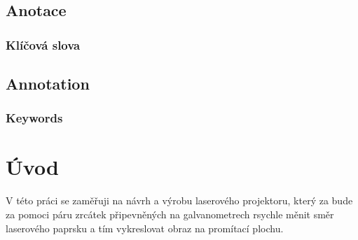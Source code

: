 \documentclass{template/socthesis}
\author{Šimon Hrouda}
\begin{document}
\newcommand{\bardgen}[3]{following text generated by ai (google bard) on #1\\%
  \begin{tcolorbox}[breakable, colback=blue!20]
      #2
  \end{tcolorbox}
  \begin{tcolorbox}[breakable, colback=blue!10, colframe=white]
      #3
  \end{tcolorbox}
}


\maketitle



\pagestyle{empty}

\section*{Anotace}


\subsection*{Klíčová slova}


\vspace{20mm}

\section*{Annotation}


\subsection*{Keywords}


\newpage
\pagestyle{plain}

\tableofcontents %

\setcounter{figure}{0}
\setcounter{table}{0}
\newpage

\chapter*{Úvod}
V této práci se zaměřuji na návrh a výrobu laserového projektoru, který za bude za pomoci páru zrcátek připevněných na galvanometrech rsychle měnit směr laserového paprsku a tím vykreslovat obraz na promítací plochu.
\end{document}
